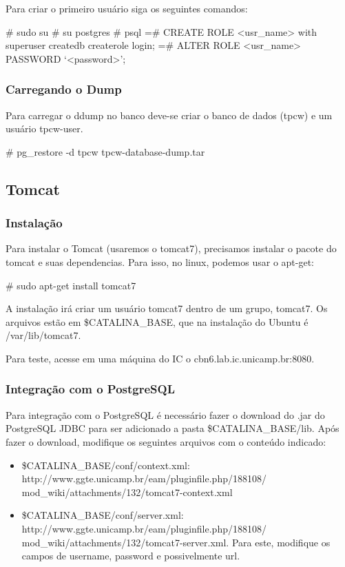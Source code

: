 \documentclass[a4paper,10pt]{article}
\begin{document}
    Para criar o primeiro usuário siga os seguintes comandos:
        \begin{spverbatim}
            # sudo su
            # su postgres
            # psql
            =# CREATE ROLE <usr_name> with superuser createdb createrole login;
            =# ALTER ROLE <usr_name> PASSWORD ‘<password>’;
        \end{spverbatim}

        \subsubsection{Carregando o Dump}
        Para carregar o ddump no banco deve-se criar o banco de dados (tpcw) e um usuário tpcw-user.
        \begin{spverbatim}
        # pg_restore -d tpcw tpcw-database-dump.tar
        \end{spverbatim}


    \subsection{Tomcat}
        \subsubsection{Instalação}
        Para instalar o Tomcat (usaremos o tomcat7), precisamos instalar o pacote do tomcat e suas dependencias. Para isso, no linux, podemos usar o apt-get:
        \begin{spverbatim}
        # sudo apt-get install tomcat7
        \end{spverbatim}

        A instalação irá criar um usuário tomcat7 dentro de um grupo, tomcat7. Os arquivos estão em \$CATALINA\_BASE, que na instalação do Ubuntu é /var/lib/tomcat7.

        Para teste, acesse em uma máquina do IC o cbn6.lab.ic.unicamp.br:8080.

        \subsubsection{Integração com o PostgreSQL}
        Para integração com o PostgreSQL é necessário fazer o download do .jar do PostgreSQL JDBC para ser adicionado a pasta \$CATALINA\_BASE/lib. Após fazer o download, modifique os seguintes arquivos com o conteúdo indicado:

        \begin{itemize}
        \setlength{\itemindent}{-.0in}
            \item \$CATALINA\_BASE/conf/context.xml: http://www.ggte.unicamp.br/eam/pluginfile.php/188108/
            mod\_wiki/attachments/132/tomcat7-context.xml
            \item \$CATALINA\_BASE/conf/server.xml: http://www.ggte.unicamp.br/eam/pluginfile.php/188108/
            mod\_wiki/attachments/132/tomcat7-server.xml. Para este, modifique os campos de username, password e possivelmente url.
        \end{itemize}
\end{document}
